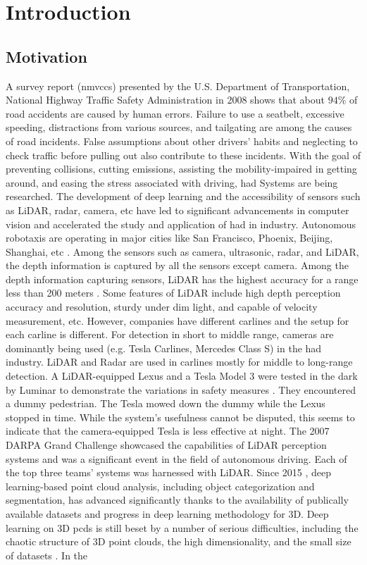 \chapter{Introduction}

\section{Motivation}
A survey report (\acrshort{nmvccs}) presented by the  U.S. Department of Transportation, National Highway Traffic Safety Administration in 2008 \parencite{nmvccs} shows that about \(94\%\) of road accidents are caused by human errors. Failure to use a seatbelt, excessive speeding, distractions from various sources, and tailgating are among the causes of road incidents. False assumptions about other drivers' habits and neglecting to check traffic before pulling out also contribute to these incidents. With the goal of preventing collisions, cutting emissions, assisting the mobility-impaired in getting around, and easing the stress associated with driving, \acrfull{had} Systems are being researched. The development of deep learning and the accessibility of sensors such as LiDAR, radar, camera, etc have led to significant advancements in computer vision and accelerated the study and application of \acrshort{had} in industry. Autonomous robotaxis are operating in major cities like San Francisco, Phoenix, Beijing, Shanghai, etc \parencite{robotaxis}. Among the sensors such as camera, ultrasonic, radar, and LiDAR, the depth information is captured by all the sensors except camera. Among the depth information capturing sensors, LiDAR has the highest accuracy for a range less than 200 meters \parencite{Yurtsever_2020}. Some features of LiDAR include high depth perception accuracy and resolution, sturdy under dim light, and capable of velocity measurement, etc. However, companies have different carlines and the setup for each carline is different. For detection in short to middle range, cameras are dominantly being used (e.g. Tesla Carlines, Mercedes Class S) in the \acrshort{had} industry. LiDAR and Radar are used in carlines mostly for middle to long-range detection. A LiDAR-equipped Lexus and a Tesla Model 3 were tested in the dark by Luminar to demonstrate the variations in safety measures \parencite{tesla_vs_lexus}. They encountered a dummy pedestrian. The Tesla mowed down the dummy while the Lexus stopped in time. While the system's usefulness cannot be disputed, this seems to indicate that the camera-equipped Tesla is less effective at night. The 2007 DARPA Grand Challenge showcased the capabilities of LiDAR perception systems and was a significant event in the field of autonomous driving. Each of the top three teams' systems was harnessed with LiDAR. Since 2015 \parencite{guo2020deep}, deep learning-based point cloud analysis, including object categorization and segmentation, has advanced significantly thanks to the availability of publically available datasets and progress in deep learning methodology for 3D. Deep learning on 3D \acrshort{pcd}s is still beset by a number of serious difficulties, including the chaotic structure of 3D point clouds, the high dimensionality, and the small size of datasets \parencite{qi2017pointnet}. In the 